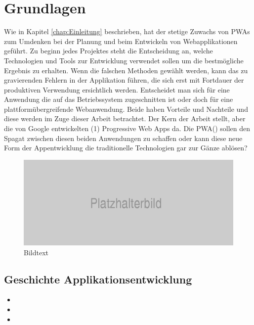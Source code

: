 \chapter{Grundlagen}
\thispagestyle{standard}
\pagestyle{standard}
\renewcommand{\footrulewidth}{0.4pt}

Wie in Kapitel \ref{chap:Einleitung} beschrieben, hat der stetige Zuwachs von \acs{PWA}s zum Umdenken bei der Planung und beim Entwickeln von Webapplikationen geführt.
Zu beginn jedes Projektes steht die Entscheidung an, welche Technologien und Tools zur Entwicklung verwendet sollen um die bestmögliche Ergebnis zu erhalten.
Wenn die falschen Methoden gewählt werden, kann das zu gravierenden Fehlern in der Applikation führen, die sich erst mit Fortdauer der produktiven Verwendung ersichtlich werden.
Entscheidet man sich für eine Anwendung die auf das Betriebssystem zugeschnitten ist oder doch für eine plattformübergreifende Webanwendung. Beide haben Vorteile und Nachteile und diese werden im Zuge dieser Arbeit betrachtet. Der Kern der Arbeit stellt, aber die von Google entwickelten (1) Progressive Web Apps da. Die PWA() sollen den Spagat zwischen diesen beiden Anwendungen zu schaffen oder kann diese neue Form der Appentwicklung die traditionelle Technologien gar zur Gänze ablösen?



\begin{figure}[h]
	\centering
	\includegraphics[width=14cm]{BilderAllgemein/Platzhalter}\medskip
	\caption{Bildtext \cite{Quelle}}
	\label{fig:Übersicht des OpenNES Konzepts}
\end{figure}

 
\section{Geschichte Applikationsentwicklung}

\begin{itemize}
    \item 
	\item 
	\item 
\end{itemize}



